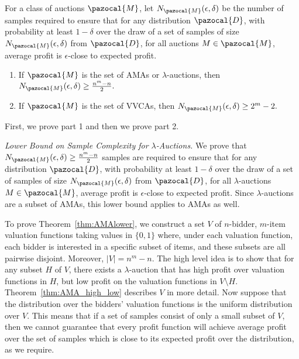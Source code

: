 

\begin{theorem}
	\label{thm:lower}
	For a class of auctions $\pazocal{M}$, let $N_{\pazocal{M}}(\epsilon, \delta)$ be the number of samples required to ensure that for any distribution $\pazocal{D}$, with probability at least $1-\delta$ over the draw of a set of samples of size $N_{\pazocal{M}}(\epsilon, \delta)$ from $\pazocal{D}$, for all auctions $M \in \pazocal{M}$, average profit is $\epsilon$-close to expected profit. 
	\begin{enumerate}
		\item If $\pazocal{M}$ is the set of AMAs or $\lambda$-auctions, then $N_{\pazocal{M}}(\epsilon, \delta) \geq \frac{n^m - n}{2}.$
		\item If $\pazocal{M}$ is the set of VVCAs, then $N_{\pazocal{M}}(\epsilon, \delta) \geq 2^m - 2.$
	\end{enumerate}
\end{theorem}

First, we prove part 1 and then we prove part 2.

\bigskip\emph{Lower Bound on Sample Complexity for $\lambda$-Auctions.}
We prove that $N_{\pazocal{M}}(\epsilon, \delta) \geq \frac{n^m-n}{2}$ samples are required to ensure that for any distribution $\pazocal{D}$, with probability at least $1-\delta$ over the draw of a set of samples of size $N_{\pazocal{M}}(\epsilon, \delta)$ from $\pazocal{D}$, for all $\lambda$-auctions $M \in \pazocal{M}$, average profit is $\epsilon$-close to expected profit.
 Since $\lambda$-auctions are a subset of AMAs, this lower bound applies to AMAs as well.

To prove Theorem~\ref{thm:AMAlower}, we construct a set $V$ of $n$-bidder, $m$-item valuation functions taking values in $\{0,1\}$ where, under each valuation function, each bidder is interested in a specific subset of items, and these subsets are all pairwise disjoint. Moreover, $|V| = n^m - n$. The high level idea is to show that for any subset $H$ of $V$, there exists a $\lambda$-auction that has high profit over valuation functions in $H$, but low profit on the valuation functions in $V \setminus H$. Theorem~\ref{thm:AMA_high_low} describes $V$ in more detail. Now suppose that the distribution over the bidders' valuation functions is the uniform distribution over $V$. This means that if a set of samples consist of only a small subset of $V$, then we cannot guarantee that every profit function will achieve average profit over the set of samples which is close to its expected profit over the distribution, as we require.

